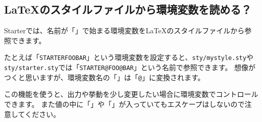 \begin{starterterminal}\end{starterterminal}

\subsection*{\LaTeX{}のスタイルファイルから環境変数を読める？}
\label{sec:2-7-3}

Starterでは、名前が「」で始まる環境変数を\LaTeX{}のスタイルファイルから参照できます。

たとえば「\texttt{STARTER\textunderscore{}FOO\textunderscore{}BAR}」という環境変数を設定すると、\texttt{sty/mystyle.sty}や\texttt{sty/starter.sty}では「\texttt{\reviewbackslash{}STARTER@FOO@BAR}」という名前で参照できます。
想像がつくと思いますが、環境変数名の「\texttt{\textunderscore{}}」は「\texttt{@}」に変換されます。

\label{}
\begin{starterterminal}\end{starterterminal}
\label{}
\begin{starterprogram}\end{starterprogram}

この機能を使うと、出力や挙動を少し変更したい場合に環境変数でコントロールできます。
また値の中に「\texttt{\textdollar{}}」や「\texttt{\reviewbackslash{}}」が入っていてもエスケープはしないので注意してください。
